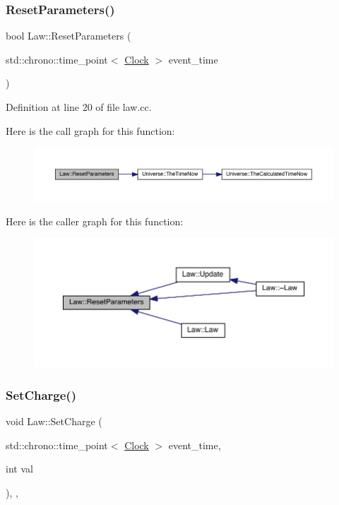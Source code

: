 \subsubsection{\texorpdfstring{Reset\+Parameters()}{ResetParameters()}}
{\footnotesize\ttfamily bool Law\+::\+Reset\+Parameters (\begin{DoxyParamCaption}\item[{std\+::chrono\+::time\+\_\+point$<$ \hyperlink{universe_8h_a0ef8d951d1ca5ab3cfaf7ab4c7a6fd80}{Clock} $>$}]{event\+\_\+time }\end{DoxyParamCaption})}



Definition at line 20 of file law.\+cc.

Here is the call graph for this function\+:
\nopagebreak
\begin{figure}[H]
\begin{center}
\leavevmode
\includegraphics[width=350pt]{class_law_a56541ec0b82b8a7c377ae2e6b444205c_cgraph}
\end{center}
\end{figure}
Here is the caller graph for this function\+:
\nopagebreak
\begin{figure}[H]
\begin{center}
\leavevmode
\includegraphics[width=350pt]{class_law_a56541ec0b82b8a7c377ae2e6b444205c_icgraph}
\end{center}
\end{figure}
\mbox{\label{class_law_a2e780573f6285f88d167d45a2e243d01}} 
\subsubsection{\texorpdfstring{Set\+Charge()}{SetCharge()}}
{\footnotesize\ttfamily void Law\+::\+Set\+Charge (\begin{DoxyParamCaption}\item[{std\+::chrono\+::time\+\_\+point$<$ \hyperlink{universe_8h_a0ef8d951d1ca5ab3cfaf7ab4c7a6fd80}{Clock} $>$}]{event\+\_\+time,  }\item[{int}]{val }\end{DoxyParamCaption})\hspace{0.3cm}{\ttfamily [inline]}, {\ttfamily [final]}, {\ttfamily [virtual]}}



